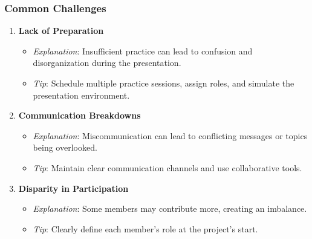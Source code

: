 \documentclass[aspectratio=169]{beamer}
\begin{document}
\begin{frame}[fragile]
  \frametitle{Common Challenges}
  \begin{enumerate}
    \item \textbf{Lack of Preparation}
      \begin{itemize}
        \item \textit{Explanation}: Insufficient practice can lead to confusion and disorganization during the presentation.
        \item \textit{Tip}: Schedule multiple practice sessions, assign roles, and simulate the presentation environment.
      \end{itemize}
    
    \item \textbf{Communication Breakdowns}
      \begin{itemize}
        \item \textit{Explanation}: Miscommunication can lead to conflicting messages or topics being overlooked.
        \item \textit{Tip}: Maintain clear communication channels and use collaborative tools.
      \end{itemize}
    
    \item \textbf{Disparity in Participation}
      \begin{itemize}
        \item \textit{Explanation}: Some members may contribute more, creating an imbalance.
        \item \textit{Tip}: Clearly define each member's role at the project's start.
      \end{itemize}
  \end{enumerate}
\end{frame}
\end{document}
